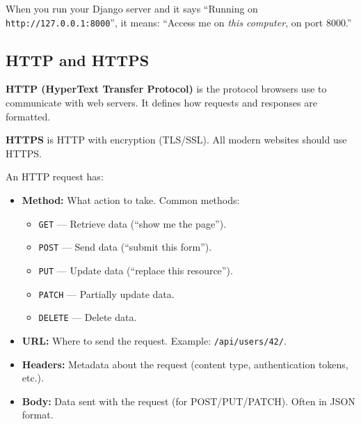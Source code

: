 \documentclass[12pt, a4paper, oneside]{book}
\begin{document}
When you run your Django server and it says ``Running on \texttt{http://127.0.0.1:8000}'', it means: ``Access me on \emph{this computer}, on port 8000.''

\subsection{HTTP and HTTPS}

\textbf{HTTP (HyperText Transfer Protocol)} is the protocol browsers use to communicate with web servers. It defines how requests and responses are formatted.

\textbf{HTTPS} is HTTP with encryption (TLS/SSL). All modern websites should use HTTPS.

An HTTP request has:
\begin{itemize}[leftmargin=2em]
    \item \textbf{Method:} What action to take. Common methods:
    \begin{itemize}
        \item \texttt{GET} — Retrieve data (``show me the page'').
        \item \texttt{POST} — Send data (``submit this form'').
        \item \texttt{PUT} — Update data (``replace this resource'').
        \item \texttt{PATCH} — Partially update data.
        \item \texttt{DELETE} — Delete data.
    \end{itemize}
    \item \textbf{URL:} Where to send the request. Example: \texttt{/api/users/42/}.
    \item \textbf{Headers:} Metadata about the request (content type, authentication tokens, etc.).
    \item \textbf{Body:} Data sent with the request (for POST/PUT/PATCH). Often in JSON format.
\end{itemize}
\end{document}

